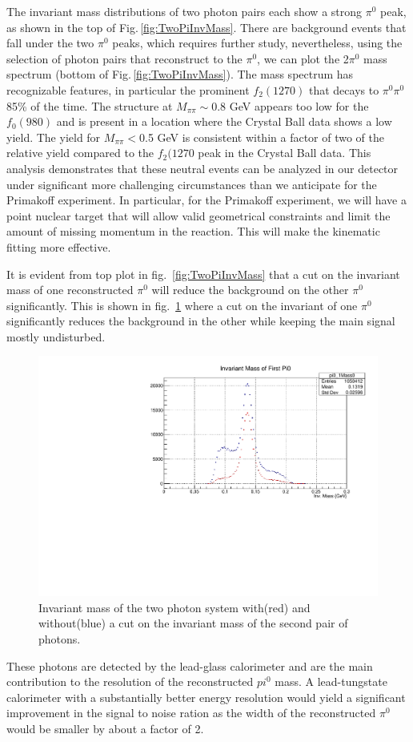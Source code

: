 The invariant mass distributions of two photon pairs each show a
strong $\pi^0$ peak, as shown in the top of
Fig.\,\ref{fig:TwoPiInvMass}. There are background events that fall
under the two $\pi^0$ peaks, which requires further study,
nevertheless, using the selection of photon pairs that reconstruct to
the $\pi^0$, we can plot the 2$\pi^0$ mass spectrum (bottom of
Fig.\,\ref{fig:TwoPiInvMass}). The mass spectrum has recognizable
features, in particular the prominent $f_2(1270)$ that decays to
$\pi^0\pi^0$ 85\% of the time. The structure at $M_{\pi\pi}\sim$0.8
GeV appears too low for the $f_0(980)$ and is present in a location
where the Crystal Ball data \cite{Marsiske:1990hx} shows a low
yield. The yield for $M_{\pi\pi}<$0.5 GeV is consistent within a
factor of two of the relative yield compared to the $f_2(1270$ peak in
the Crystal Ball data. This analysis demonstrates that these neutral
events can be analyzed in our detector under significant more
challenging circumstances than we anticipate for the Primakoff
experiment. In particular, for the Primakoff experiment, we will have
a point nuclear target that will allow valid geometrical constraints
and limit the amount of missing momentum in the reaction. This will
make the kinematic fitting more effective.

It is evident from top plot in fig.~\ref{fig:TwoPiInvMass} that a cut
on the invariant mass of one reconstructed $\pi^{0}$ will reduce the
background on the other $\pi^{0}$ significantly. This is shown in
fig.~\ref{fig:pi0yield} where a cut on the invariant of one $\pi^{0}$
significantly reduces the background in the other while keeping the
main signal mostly undisturbed.
\begin{figure}[htp]
\centering\includegraphics[width=4.75in]{figures/pi0_inv_mass_withpi02cut.pdf}
\caption{Invariant mass of the two photon system with(red) and without(blue) a cut on the invariant mass of the second pair of photons.
\label{fig:pi0yield}}
\end{figure}

These photons are detected by the lead-glass calorimeter and are the
main contribution to the resolution of the reconstructed $pi^{0}$
mass. A lead-tungstate calorimeter with a substantially better energy
resolution would yield a significant improvement in the signal to
noise ration as the width of the reconstructed $\pi^{0}$ would be
smaller by about a factor of 2.
